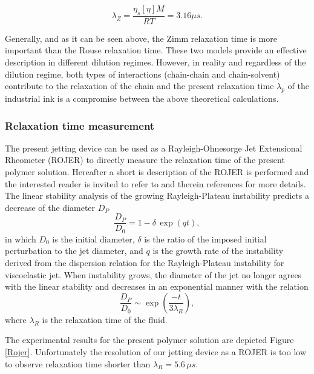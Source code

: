 \documentclass[twocolumn,10pt]{asme2ej}
\begin{document}
\begin{equation}
    \lambda_Z = \frac{\eta_s [\eta] M}{RT} = 3.16 \mu s.
    \label{zimm} 
\end{equation}

Generally, and as it can be seen above, the Zimm relaxation time is more important than the Rouse relaxation time. These two models provide an effective description in different dilution regimes. However, in reality and regardless of the dilution regime, both types of interactions (chain-chain and chain-solvent) contribute to the relaxation of the chain and the present relaxation time $\lambda_p$ of the industrial ink is a compromise between the above theoretical calculations.

\subsubsection*{Relaxation time measurement}
The present jetting device can be used as a Rayleigh-Ohnesorge Jet Extensional Rheometer (ROJER) \cite{keshavarz2015studying} to directly measure the relaxation time of the present polymer solution. Hereafter a short is description of the ROJER is performed and the interested reader is invited to refer to \cite{keshavarz2015studying} and therein references for more details.
\\
The linear stability analysis of the growing Rayleigh-Plateau instability predicts a decrease of the diameter $D_P$
\begin{equation}
    \frac{D_P}{D_0}=1-\delta \, \exp(qt),
    \label{veDecay}
\end{equation}
in which $D_0$ is the initial diameter, $\delta$ is the ratio of the imposed initial perturbation to the jet diameter, and $q$ is the growth rate of the instability derived from the dispersion relation for the Rayleigh-Plateau instability for viscoelastic jet. When instability grows, the diameter of the jet no longer agrees with the linear stability and decreases in an exponential manner with the relation 
\begin{equation}
    \frac{D_P}{D_0} \sim \exp\left(\frac{-t}{3\lambda_R}\right),
\end{equation} 
where $\lambda_R$ is the relaxation time of the fluid.

The experimental results for the present polymer solution are depicted Figure \ref{Rojer}. Unfortunately the resolution of our jetting device as a ROJER is too low to observe relaxation time shorter than $\lambda_R=5.6 \, \mu s$.
\end{document}
